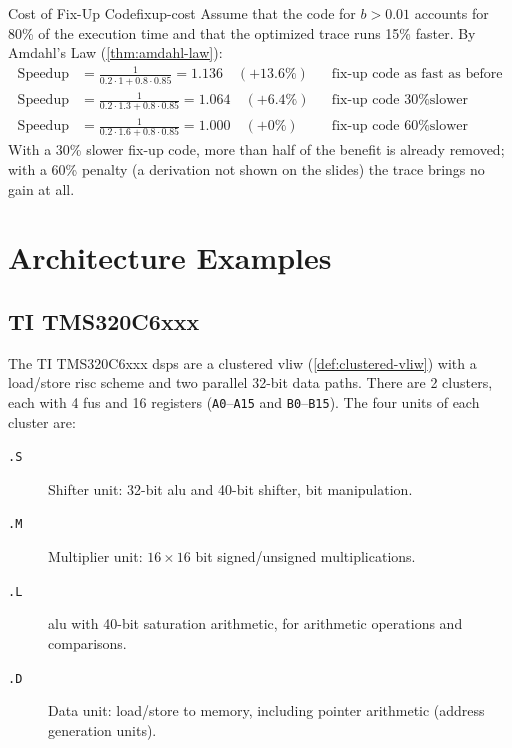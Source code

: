 \begin{observation}{Cost of Fix-Up Code}{fixup-cost}
    Assume that the code for $b > 0.01$ accounts for 80\% of the execution time and that the optimized trace runs 15\% faster. By Amdahl's Law (\cref{thm:amdahl-law}):
    \begin{align*}
        \text{Speedup} &= \frac{1}{0.2 \cdot 1 + 0.8 \cdot 0.85} = 1.136 \quad (+13.6\%) && \text{fix-up code as fast as before}\\
        \text{Speedup} &= \frac{1}{0.2 \cdot 1.3 + 0.8 \cdot 0.85} = 1.064 \quad (+6.4\%) && \text{fix-up code 30\% slower}\\
        \text{Speedup} &= \frac{1}{0.2 \cdot 1.6 + 0.8 \cdot 0.85} = 1.000 \quad (+0\%) && \text{fix-up code 60\% slower}
    \end{align*}
    With a 30\% slower fix-up code, more than half of the benefit is already removed; with a 60\% penalty (a derivation not shown on the slides) the trace brings no gain at all.
\end{observation}

\section{ Architecture Examples}
\label{sec:vliw_examples}

\subsection{TI TMS320C6xxx}

The TI TMS320C6xxx \glspl{dsp} are a clustered \gls{vliw} (\cref{def:clustered-vliw}) with a load/store \gls{risc} scheme and two parallel 32-bit data paths. There are 2 clusters, each with 4 \glspl{fu} and 16 registers (\texttt{A0}--\texttt{A15} and \texttt{B0}--\texttt{B15}). The four units of each cluster are:
\begin{description}
    \item[\texttt{.S}] Shifter unit: 32-bit \gls{alu} and 40-bit shifter, bit manipulation.
    \item[\texttt{.M}] Multiplier unit: $16 \times 16$ bit signed/unsigned multiplications.
    \item[\texttt{.L}] \gls{alu} with 40-bit saturation arithmetic, for arithmetic operations and comparisons.
    \item[\texttt{.D}] Data unit: load/store to memory, including pointer arithmetic (address generation units).
\end{description}

